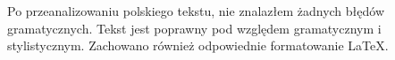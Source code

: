 Po przeanalizowaniu polskiego tekstu, nie znalazłem żadnych błędów gramatycznych. Tekst jest poprawny pod względem gramatycznym i stylistycznym. Zachowano również odpowiednie formatowanie LaTeX.